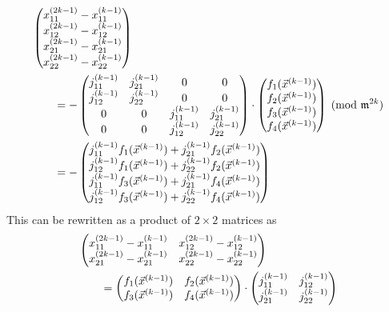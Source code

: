 \[
\begin{aligned}
\null & \begin{pmatrix}
  x_{11}^{(2k-1)} - x_{11}^{(k-1)} \\
  x_{12}^{(2k-1)} - x_{12}^{(k-1)} \\
  x_{21}^{(2k-1)} - x_{21}^{(k-1)} \\
  x_{22}^{(2k-1)} - x_{22}^{(k-1)} \end{pmatrix} \\
\null & \qquad =
- \begin{pmatrix}
   j_{11}^{(k-1)} & j_{21}^{(k-1)} & 0 & 0 \\
   j_{12}^{(k-1)} & j_{22}^{(k-1)} & 0 & 0 \\
   0 & 0 & j_{11}^{(k-1)} & j_{21}^{(k-1)} \\
   0 & 0 & j_{12}^{(k-1)} & j_{22}^{(k-1)} \end{pmatrix}
\cdot
\begin{pmatrix}
  f_1(\vec{x}^{(k-1)}) \\ 
  f_2(\vec{x}^{(k-1)}) \\
  f_3(\vec{x}^{(k-1)}) \\ 
  f_4(\vec{x}^{(k-1)}) \end{pmatrix} \\
\null & \qquad = - \begin{pmatrix}
    j_{11}^{(k-1)}f_1(\vec{x}^{(k-1)}) + j_{21}^{(k-1)}f_2(\vec{x}^{(k-1)})\\
    j_{12}^{(k-1)}f_1(\vec{x}^{(k-1)}) + j_{22}^{(k-1)}f_2(\vec{x}^{(k-1)})\\
    j_{11}^{(k-1)}f_3(\vec{x}^{(k-1)}) + j_{21}^{(k-1)}f_4(\vec{x}^{(k-1)})\\
    j_{12}^{(k-1)}f_3(\vec{x}^{(k-1)}) + j_{22}^{(k-1)}f_4(\vec{x}^{(k-1)})
    \end{pmatrix}
\\
\end{aligned}
\pmod{\mathfrak{m}^{2k}}
\]
This can be rewritten as a product of $2 \times 2$ matrices as 
\[
\begin{aligned}
\null & \begin{pmatrix}
  x_{11}^{(2k-1)} - x_{11}^{(k-1)} &
  x_{12}^{(2k-1)} - x_{12}^{(k-1)} \\
  x_{21}^{(2k-1)} - x_{21}^{(k-1)} &
  x_{22}^{(2k-1)} - x_{22}^{(k-1)} \end{pmatrix} \\
\null & \qquad =
\begin{pmatrix}
  f_1(\vec{x}^{(k-1)}) & f_2(\vec{x}^{(k-1)}) \\
  f_3(\vec{x}^{(k-1)}) & f_4(\vec{x}^{(k-1)}) \end{pmatrix}
\cdot
\begin{pmatrix}
   j_{11}^{(k-1)} & j_{12}^{(k-1)} \\
   j_{21}^{(k-1)} & j_{22}^{(k-1)} \end{pmatrix}
\end{aligned}
\]


